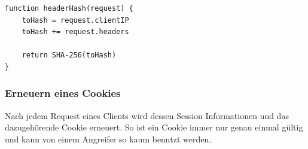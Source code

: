 \begin{lstlisting}[caption=Hashen des Headers eines Client Requests,label={lst:verify}]
function headerHash(request) {
    toHash = request.clientIP
    toHash += request.headers

    return SHA-256(toHash) 
}
\end{lstlisting}

\subsubsection{Erneuern eines Cookies}

Nach jedem Request eines Clients wird dessen Session Informationen und das dazugehörende Cookie
erneuert. So ist ein Cookie immer nur genau einmal gültig und kann von einem Angreifer so kaum 
benutzt werden.
